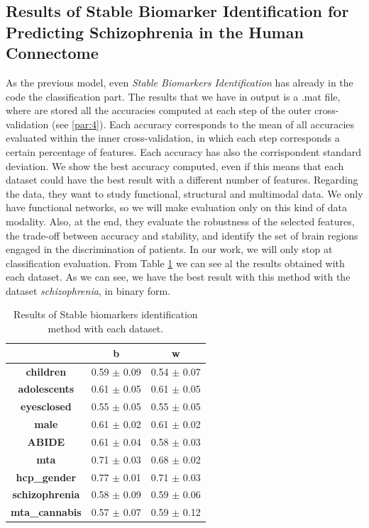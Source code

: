 \subsection{Results of Stable Biomarker Identification for Predicting Schizophrenia in the Human Connectome}

As the previous model, even \textit{Stable Biomarkers Identification} has already in the code the classification part. The results that we have in output is a .mat file, where are stored all the accuracies computed at each step of the outer cross-validation (see \ref{par:4}). Each accuracy corresponds to the mean of all accuracies evaluated within the inner cross-validation, in which each step corresponds a certain percentage of features. Each accuracy has also the corrispondent standard deviation. We show the best accuracy computed, even if this means that each dataset could have the best result with a different number of features. Regarding the data, they want to study functional, structural and multimodal data. We only have functional networks, so we will make evaluation only on this kind of data modality. Also, at the end, they evaluate the robustness of the selected features, the trade-off between accuracy and stability, and identify the set of brain regions engaged in the discrimination of patients. In our work, we will only stop at classification evaluation. From Table \ref{tab:biomarkers} we can see al the results obtained with each dataset. As we can see, we have the best result with this method with the dataset \textit{schizophrenia}, in binary form.
\vspace{0.5cm}

\begin{table}
	\centering
	\begin{tabular}{c|l|c} 
		\toprule
		& \multicolumn{1}{c|}{b} & w                \\ 
		\midrule
		\textbf{children}      & 0.59 $\pm$ 0.09        & 0.54 $\pm$ 0.07  \\
		\textbf{adolescents}   & 0.61 $\pm$ 0.05        & 0.61 $\pm$ 0.05  \\
		\textbf{eyesclosed}    & 0.55 $\pm$ 0.05        & 0.55 $\pm$ 0.05  \\
		\textbf{male}          & 0.61 $\pm$ 0.02        & 0.61 $\pm$ 0.02  \\
		\textbf{ABIDE}         & 0.61 $\pm$ 0.04        & 0.58 $\pm$ 0.03  \\
		\textbf{mta}           & 0.71 $\pm$ 0.03        & 0.68 $\pm$ 0.02  \\
		\textbf{hcp\_gender}   & 0.77 $\pm$ 0.01        & 0.71 $\pm$ 0.03  \\
		\textbf{schizophrenia} & 0.58 $\pm$ 0.09        & 0.59 $\pm$ 0.06  \\
		\textbf{mta\_cannabis} & 0.57 $\pm$ 0.07        & 0.59 $\pm$ 0.12 
	\end{tabular}
\caption{Results of Stable biomarkers identification method with each dataset.}
\label{tab:biomarkers}
\end{table}

